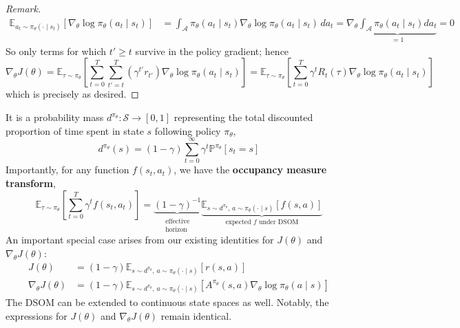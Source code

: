 \documentclass[11pt, letterpaper]{article}
\let\geq\geqslant
\newenvironment{remark}
    {\renewcommand\qedsymbol{\(\blacksquare\)}\begin{proof}[Remark]}
    {\end{proof}}
\begin{document}
\begin{remark}
\begin{align*}
        \mathbb{E}_{a_t \sim \pi_\theta(\cdot \mid s_t)}[\nabla_\theta \log \pi_\theta(a_t \mid s_t)]
        &= \int_{\mathcal{A}} \pi_\theta(a_t \mid s_t) \nabla_\theta \log \pi_\theta(a_t \mid s_t) \, da_t 
        = \nabla_\theta \underbrace{\int_{\mathcal{A}} \pi_\theta(a_t \mid s_t) da_t}_{=1}
        = 0
    \end{align*}
    So only terms for which \(t' \geq t\) survive in the policy gradient; hence
    \[
        \nabla_\theta J(\theta) 
        = \mathbb{E}_{\tau \sim \pi_\theta} \left[ \sum_{t=0}^T \sum_{t'=t}^T \left(\gamma^{t'} r_{t'}\right) \nabla_\theta \log \pi_\theta(a_t \mid s_t) \right]
        = \mathbb{E}_{\tau \sim \pi_\theta} \left[\sum_{t=0}^T \gamma^t R_t(\tau) \nabla_\theta \log \pi_\theta(a_t \mid s_t)\right]
    \]
    which is precisely as desired. 
\end{remark}

\begin{concept}
    It is a probability mass \(d^{\pi_\theta} : \mathcal{S} \to [0,1]\) representing the total discounted proportion of time spent in state \(s\) following policy \(\pi_\theta\), 
    \[
        d^{\pi_\theta}(s) 
        = (1 - \gamma) \sum_{t=0}^\infty \gamma^t \mathbb{P}^{\pi_\theta}[s_t = s]
    \]
    Importantly, for any function \(f(s_t, a_t)\), we have the \textbf{occupancy measure transform}, 
    \[
        \mathbb{E}_{\tau \sim \pi_\theta}\left[ \sum_{t=0}^T \gamma^t f(s_t, a_t) \right]
        = \underbrace{(1 - \gamma)^{-1}}_{\substack{\text{effective} \\ \text{horizon}}} \underbrace{\mathbb{E}_{s \sim d^{\pi_\theta},\, a \sim \pi_\theta(\cdot \mid s)} [f(s,a)]}_{\text{expected } f \text{ under  DSOM}}
    \]
    An important special case arises from our existing identities for \(J(\theta)\) and \(\nabla_\theta J(\theta)\): 
    \begin{align*}
        J(\theta) &= (1 - \gamma) \mathbb{E}_{s \sim d^{\pi_\theta},\, a \sim \pi_\theta(\cdot \mid s)}[r(s, a)] \\
        \nabla_\theta J(\theta) &= (1 - \gamma) \mathbb{E}_{s \sim d^{\pi_\theta},\, a \sim \pi_\theta(\cdot \mid s)}[A^{\pi_\theta}(s, a) \nabla_\theta \log \pi_\theta(a \mid s)]
    \end{align*}
    The DSOM can be extended to continuous state spaces as well. Notably, the expressions for \(J(\theta)\) and \(\nabla_\theta J(\theta)\) remain identical. 
\end{concept}
\end{document}
